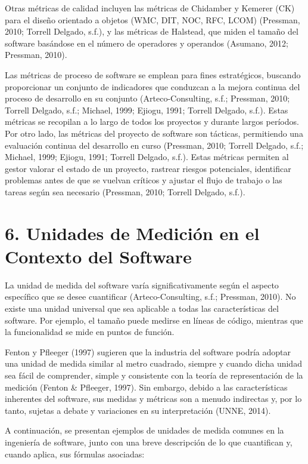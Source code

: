 \documentclass[11pt]{article}
\begin{document}
Otras métricas de calidad incluyen las métricas de Chidamber y Kemerer (CK) para el diseño orientado a objetos (WMC, DIT, NOC, RFC, LCOM) (Pressman, 2010; Torrell Delgado, s.f.), y las métricas de Halstead, que miden el tamaño del software basándose en el número de operadores y operandos (Asumano, 2012; Pressman, 2010).

Las métricas de proceso de software se emplean para fines estratégicos, buscando proporcionar un conjunto de indicadores que conduzcan a la mejora continua del proceso de desarrollo en su conjunto (Arteco-Consulting, s.f.; Pressman, 2010; Torrell Delgado, s.f.; Michael, 1999; Ejiogu, 1991; Torrell Delgado, s.f.). Estas métricas se recopilan a lo largo de todos los proyectos y durante largos períodos. Por otro lado, las métricas del proyecto de software son tácticas, permitiendo una evaluación continua del desarrollo en curso (Pressman, 2010; Torrell Delgado, s.f.; Michael, 1999; Ejiogu, 1991; Torrell Delgado, s.f.). Estas métricas permiten al gestor valorar el estado de un proyecto, rastrear riesgos potenciales, identificar problemas antes de que se vuelvan críticos y ajustar el flujo de trabajo o las tareas según sea necesario (Pressman, 2010; Torrell Delgado, s.f.).

\section{6. Unidades de Medición en el Contexto del Software}

La unidad de medida del software varía significativamente según el aspecto específico que se desee cuantificar (Arteco-Consulting, s.f.; Pressman, 2010). No existe una unidad universal que sea aplicable a todas las características del software. Por ejemplo, el tamaño puede medirse en líneas de código, mientras que la funcionalidad se mide en puntos de función.

Fenton y Pfleeger (1997) sugieren que la industria del software podría adoptar una unidad de medida similar al metro cuadrado, siempre y cuando dicha unidad sea fácil de comprender, simple y consistente con la teoría de representación de la medición (Fenton \& Pfleeger, 1997). Sin embargo, debido a las características inherentes del software, sus medidas y métricas son a menudo indirectas y, por lo tanto, sujetas a debate y variaciones en su interpretación (UNNE, 2014).

A continuación, se presentan ejemplos de unidades de medida comunes en la ingeniería de software, junto con una breve descripción de lo que cuantifican y, cuando aplica, sus fórmulas asociadas:
\end{document}
